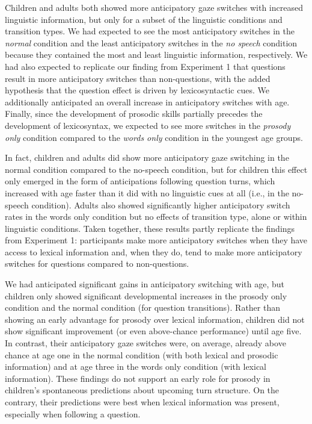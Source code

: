 \documentclass[authoryear, 12pt]{elsarticle}
\begin{document}
Children and adults both showed more anticipatory gaze switches with increased linguistic information, but only for a subset of the linguistic conditions and transition types. We had expected to see the most anticipatory switches in the \textit{normal} condition and the least anticipatory switches in the \textit{no speech} condition because they contained the most and least linguistic information, respectively. We had also expected to replicate our finding from Experiment 1 that questions result in more anticipatory switches than non-questions, with the added hypothesis that the question effect is driven by lexicosyntactic cues. We additionally anticipated an overall increase in anticipatory switches with age. Finally, since the development of prosodic skills partially precedes the development of lexicosyntax, we expected to see more switches in the \textit{prosody only} condition compared to the \textit{words only} condition in the youngest age groups.

In fact, children and adults did show more anticipatory gaze switching in the normal condition compared to the no-speech condition, but for children this effect only emerged in the form of anticipations following question turns, which increased with age faster than it did with no linguistic cues at all (i.e., in the no-speech condition). Adults also showed significantly higher anticipatory switch rates in the words only condition but no effects of transition type, alone or within linguistic conditions. Taken together, these results partly replicate the findings from Experiment 1: participants make more anticipatory switches when they have access to lexical information and, when they do, tend to make more anticipatory switches for questions compared to non-questions.

We had anticipated significant gains in anticipatory switching with age, but children only showed significant developmental increases in the prosody only condition and the normal condition (for question transitions). Rather than showing an early advantage for prosody over lexical information, children did not show significant improvement (or even above-chance performance) until age five. In contrast, their anticipatory gaze switches were, on average, already above chance at age one in the normal condition (with both lexical and prosodic information) and at age three in the words only condition (with lexical information). These findings do not support an early role for prosody in children's spontaneous predictions about upcoming turn structure. On the contrary, their predictions were best when lexical information was present, especially when following a question.
\end{document}
